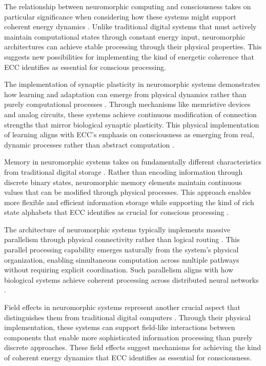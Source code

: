 The relationship between neuromorphic computing and consciousness takes on particular significance when considering how these systems might support coherent energy dynamics \cite{Neftci2019}. Unlike traditional digital systems that must actively maintain computational states through constant energy input, neuromorphic architectures can achieve stable processing through their physical properties. This suggests new possibilities for implementing the kind of energetic coherence that ECC identifies as essential for conscious processing.

The implementation of synaptic plasticity in neuromorphic systems demonstrates how learning and adaptation can emerge from physical dynamics rather than purely computational processes \cite{Roy2019}. Through mechanisms like memristive devices and analog circuits, these systems achieve continuous modification of connection strengths that mirror biological synaptic plasticity. This physical implementation of learning aligns with ECC's emphasis on consciousness as emerging from real, dynamic processes rather than abstract computation \cite{Schuman2021}.

Memory in neuromorphic systems takes on fundamentally different characteristics from traditional digital storage \cite{Sebastian2020}. Rather than encoding information through discrete binary states, neuromorphic memory elements maintain continuous values that can be modified through physical processes. This approach enables more flexible and efficient information storage while supporting the kind of rich state alphabets that ECC identifies as crucial for conscious processing \cite{Thakur2018}.

The architecture of neuromorphic systems typically implements massive parallelism through physical connectivity rather than logical routing \cite{Wang2018}. This parallel processing capability emerges naturally from the system's physical organization, enabling simultaneous computation across multiple pathways without requiring explicit coordination. Such parallelism aligns with how biological systems achieve coherent processing across distributed neural networks \cite{Yang2019}.

Field effects in neuromorphic systems represent another crucial aspect that distinguishes them from traditional digital computers \cite{Indiveri2020}. Through their physical implementation, these systems can support field-like interactions between components that enable more sophisticated information processing than purely discrete approaches. These field effects suggest mechanisms for achieving the kind of coherent energy dynamics that ECC identifies as essential for consciousness.

